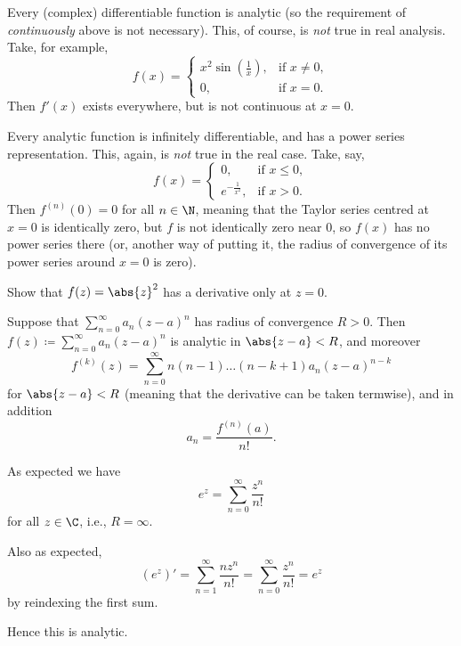 \begin{remark}\label{remark:analytic}
	\begin{items}
		\item\label{remark:analytic:1} Every (complex) differentiable function is analytic (so the requirement of \emph{continuously} above is not necessary).
		This, of course, is \emph{not} true in real analysis.
		Take, for example,
		\[
			f(x) = \begin{cases}
				x^2 \sin(\frac{1}{x}), & \text{if } x \neq 0, \\
				0, & \text{if } x = 0.
			\end{cases}
		\]
		Then $f'(x)$ exists everywhere, but is not continuous at $x = 0$.

		\item Every analytic function is infinitely differentiable, and has a power series representation.
		This, again, is \emph{not} true in the real case.
		Take, say,
		\[
			f(x) = \begin{cases}
				0, & \text{if } x \leq 0, \\
				e^{-\frac{1}{x^2}}, & \text{if } x > 0.
			\end{cases}
		\]
		Then $f^{(n)}(0) = 0$ for all $n \in \N$, meaning that the Taylor series centred at $x = 0$ is identically zero, but $f$ is not identically zero near $0$, so $f(x)$ has no power series there (or, another way of putting it, the radius of convergence of its power series around $x = 0$ is zero).
	\end{items}
\end{remark}

\begin{exercise}
	Show that $f(z) = \abs{z}^2$ has a derivative only at $z = 0$.
\end{exercise}

\begin{proposition}
	Suppose that $\sum\limits_{n = 0}^\infty a_n (z - a)^n$ has radius of convergence $R > 0$.
	Then $f(z) \coloneqq \sum\limits_{n = 0}^\infty a_n (z - a)^n$ is analytic in $\abs{z - a} < R$, and moreover
	\[
		f^{(k)}(z) = \sum_{n = 0}^\infty n (n - 1) \dots (n - k + 1) a_n (z - a)^{n - k}
	\]
	for $\abs{z - a} < R$ (meaning that the derivative can be taken termwise), and in addition
	\[
		a_n = \frac{f^{(n)}(a)}{n!}.
	\]
\end{proposition}

\begin{example}
	As expected we have
	\[
		e^z = \sum_{n = 0}^\infty \frac{z^n}{n!}
	\]
	for all $z \in \C$, i.e., $R = \infty$.

	Also as expected,
	\[
		(e^z)' = \sum_{n = 1}^\infty \frac{n z^n}{n!} = \sum_{n = 0}^\infty \frac{z^n}{n!} = e^z
	\]
	by reindexing the first sum.

	Hence this is analytic.
\end{example}


